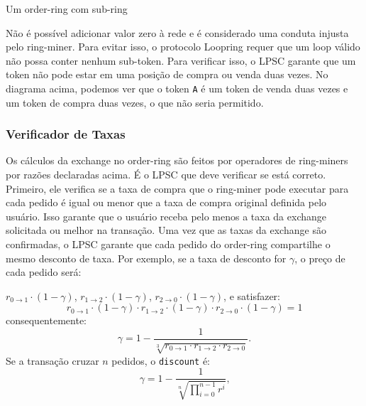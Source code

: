 \documentclass[UTF8,nofonts]{article}
\makeatletter
\newenvironment{figurehere}
 {\def\@captype{figure}}
 {}
\makeatother
\begin{document}
\begin{multicols}{2}
\begin{center}
\begin{figurehere}
\begin{tikzpicture}
\end{tikzpicture}

\caption{Um order-ring com sub-ring}
\label{fig:subring}
\end{figurehere}
\end{center}

Não é possível adicionar valor zero à rede e é considerado uma conduta injusta pelo ring-miner. Para evitar isso, o protocolo Loopring requer que um loop válido não possa conter nenhum sub-token. Para verificar isso, o LPSC garante que um token não pode estar em uma posição de compra ou venda duas vezes. No diagrama acima, podemos ver que o token \verb|A| é um token de venda duas vezes e um token de compra duas vezes, o que não seria permitido. 


\subsubsection{Verificador de Taxas\label{sec:fill_rate_check}}


Os cálculos da exchange no order-ring são feitos por operadores de ring-miners por razões declaradas acima. É o LPSC que deve verificar se está correto. Primeiro, ele verifica se a taxa de compra que o ring-miner pode executar para cada pedido é igual ou menor que a taxa de compra original definida pelo usuário. Isso garante que o usuário receba pelo menos a taxa da exchange solicitada ou melhor na transação. Uma vez que as taxas da exchange são confirmadas, o LPSC garante que cada pedido do order-ring compartilhe o mesmo desconto de taxa. Por exemplo, se a taxa de desconto for $\gamma$, o preço de cada pedido será:

$r_{0\rightarrow 1} \cdot (1-\gamma)$, $r_{1\rightarrow 2} \cdot (1-\gamma)$, $r_{2 \rightarrow 0} \cdot (1-\gamma)$, e satisfazer: 
\begin{equation}
r_{0\rightarrow 1} \cdot (1-\gamma)\cdot r_{1\rightarrow 2} \cdot (1-\gamma) \cdot r_{2 \rightarrow 0} \cdot (1-\gamma) = 1
\end{equation}
consequentemente: 
\begin{equation}
\gamma = 1- \frac{1}{\sqrt[3]{r_{0\rightarrow 1} \cdot r_{1\rightarrow 2} \cdot r_{2\rightarrow 0}}}\text{.}
\end{equation}
Se a transação cruzar $n$ pedidos, o \texttt{discount} é: 
\begin{equation}
\gamma = 1- \frac{1}{\sqrt[n]{\prod_{i=0}^{n-1} r^i}} \text{,}
\end{equation}


\end{multicols}
\end{document}
